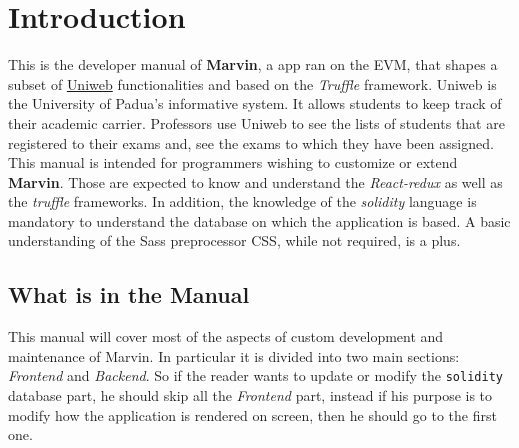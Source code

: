 \section{Introduction}
This is the developer manual of \textbf{Marvin}, a \DH app ran on the EVM, that shapes a subset of \href{www.uniweb.unipd.it}{Uniweb} functionalities and based on the \emph{Truffle} framework. Uniweb is the University of Padua's informative system.
It allows students to keep track of their academic carrier. Professors use Uniweb to see the lists of students that are registered to their exams and, see the exams to which they have been assigned.
\\This manual is intended for programmers wishing to customize or extend \textbf{Marvin}. Those are expected to know and understand the \emph{React-redux} as well as the \emph{truffle} frameworks. In addition, the knowledge of the \emph{solidity} language is mandatory to understand the database on which the application is based. A basic understanding of the Sass preprocessor CSS, while not required, is a plus.

\subsection{What is in the Manual}
This manual will cover most of the aspects of custom development and maintenance of Marvin.
In particular it is divided into two main sections: \emph{Frontend}  and \emph{Backend}. So if the reader wants to update or modify the \verb|solidity| database part, he should skip all the \emph{Frontend} part, instead if his purpose is to modify how the application is rendered on screen, then he should go to the first one.

